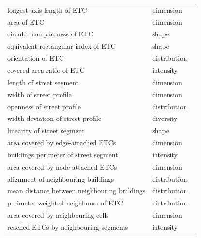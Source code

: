 \documentclass[fleqn,10pt]{wlscirep}
\begin{document}
\begin{longtable}{lll}
                            longest axis length of ETC &    dimension &  \cite{fleischmann2021} \\
                                            area of ETC &    dimension &     \cite{hamaina2012a} \\
                            circular compactness of ETC &        shape &  \cite{fleischmann2021} \\
                    equivalent rectangular index of ETC &        shape &  \cite{fleischmann2021} \\
                                    orientation of ETC & distribution &  \cite{fleischmann2021} \\
                                covered area ratio of ETC &    intensity &      \cite{hamaina2013} \\
                                length of street segment &    dimension &          \cite{gil2012} \\
                                width of street profile &    dimension &       \cite{araldi2019} \\
                            openness of street profile & distribution &       \cite{araldi2019} \\
                        width deviation of street profile &    diversity &       \cite{araldi2019} \\
                            linearity of street segment &        shape &       \cite{araldi2019} \\
                    area covered by edge-attached ETCs &    dimension &  \cite{fleischmann2021} \\
                    buildings per meter of street segment &    intensity &  \cite{fleischmann2021} \\
                    area covered by node-attached ETCs &    dimension &  \cite{fleischmann2021} \\
                    alignment of neighbouring buildings & distribution &       \cite{hijazi2016} \\
            mean distance between neighbouring buildings & distribution &       \cite{hijazi2016} \\
                    perimeter-weighted neighbours of ETC & distribution &  \cite{fleischmann2021} \\
                    area covered by neighbouring cells &    dimension &  \cite{fleischmann2021} \\
                    reached ETCs by neighbouring segments &    intensity &  \cite{fleischmann2021} \\

\end{longtable}
\end{document}
